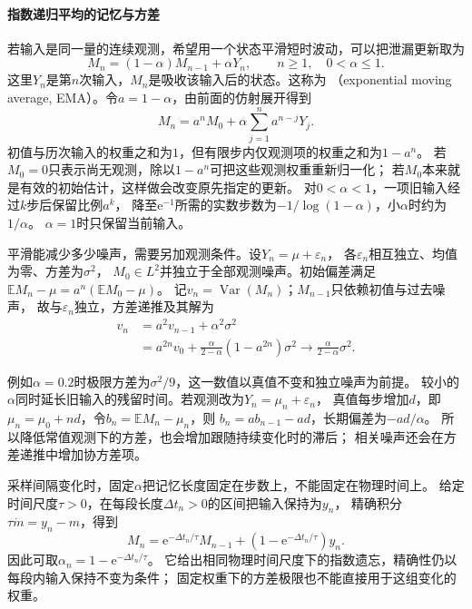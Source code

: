 \paragraph{指数递归平均的记忆与方差}
\label{sec:dynamical-exponential-average}
若输入是同一量的连续观测，希望用一个状态平滑短时波动，可以把泄漏更新取为
\begin{equation}
 M_n=(1-\alpha)M_{n-1}+\alpha Y_n,\qquad n\geq1,\quad 0<\alpha\leq1.
 \label{eq:dynamical-exponential-average}
\end{equation}
这里$Y_n$是第$n$次输入，$M_n$是吸收该输入后的状态。这称为
（exponential moving average, EMA）。令$a=1-\alpha$，由前面的仿射展开得到
\begin{equation}
 M_n=a^nM_0+\alpha\sum_{j=1}^n a^{n-j}Y_j.
 \label{eq:dynamical-exponential-average-expansion}
\end{equation}
初值与历次输入的权重之和为$1$，但有限步内仅观测项的权重之和为$1-a^n$。
若$M_0=0$只表示尚无观测，除以$1-a^n$可把这些观测权重重新归一化；
若$M_0$本来就是有效的初始估计，这样做会改变原先指定的更新。
对$0<\alpha<1$，一项旧输入经过$k$步后保留比例$a^k$，
降至$\mathrm e^{-1}$所需的实数步数为$-1/\log(1-\alpha)$，小$\alpha$时约为$1/\alpha$。
$\alpha=1$时只保留当前输入。

平滑能减少多少噪声，需要另加观测条件。设$Y_n=\mu+\varepsilon_n$，
各$\varepsilon_n$相互独立、均值为零、方差为$\sigma^2$，
$M_0\in L^2$并独立于全部观测噪声。初始偏差满足
$\mathbb E M_n-\mu=a^n(\mathbb E M_0-\mu)$。
记$v_n=\operatorname{Var}(M_n)$；$M_{n-1}$只依赖初值与过去噪声，
故与$\varepsilon_n$独立，方差递推及其解为
\begin{equation}
 \begin{aligned}
 v_n&=a^2v_{n-1}+\alpha^2\sigma^2\\
    &=a^{2n}v_0+\frac{\alpha}{2-\alpha}
                        (1-a^{2n})\sigma^2
      \longrightarrow\frac{\alpha}{2-\alpha}\sigma^2.
 \end{aligned}
 \label{eq:dynamical-exponential-average-variance}
\end{equation}

例如$\alpha=0.2$时极限方差为$\sigma^2/9$，这一数值以真值不变和独立噪声为前提。
较小的$\alpha$同时延长旧输入的残留时间。若观测改为$Y_n=\mu_n+\varepsilon_n$，
真值每步增加$d$，即$\mu_n=\mu_0+nd$，令$b_n=\mathbb E M_n-\mu_n$，则
$b_n=a b_{n-1}-ad$，长期偏差为$-ad/\alpha$。
所以降低常值观测下的方差，也会增加跟随持续变化时的滞后；
相关噪声还会在方差递推中增加协方差项。

采样间隔变化时，固定$\alpha$把记忆长度固定在步数上，不能固定在物理时间上。
给定时间尺度$\tau>0$，在每段长度$\Delta t_n>0$的区间把输入保持为$y_n$，
精确积分$\tau\dot m=y_n-m$，得到
\[
 M_n=\mathrm e^{-\Delta t_n/\tau}M_{n-1}
       +(1-\mathrm e^{-\Delta t_n/\tau})y_n.
\]
因此可取$\alpha_n=1-\mathrm e^{-\Delta t_n/\tau}$。
它给出相同物理时间尺度下的指数遗忘，精确性仍以每段内输入保持不变为条件；
固定权重下的方差极限也不能直接用于这组变化的权重。

